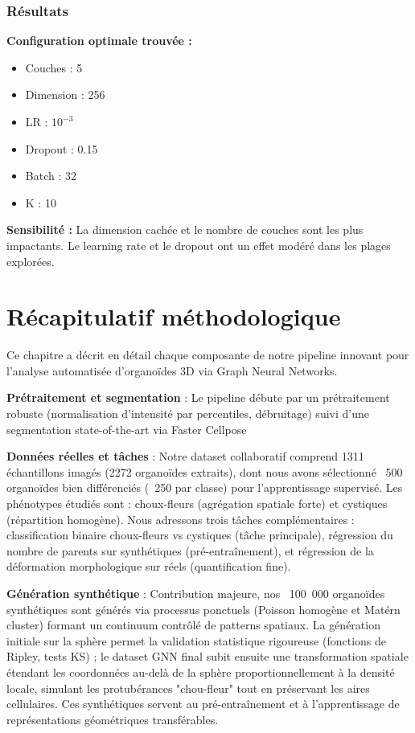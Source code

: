 \subsubsection{Résultats}

\textbf{Configuration optimale trouvée :}
\begin{itemize}
    \item Couches : 5
    \item Dimension : 256
    \item LR : $10^{-3}$
    \item Dropout : 0.15
    \item Batch : 32
    \item K : 10
\end{itemize}

\textbf{Sensibilité :}
La dimension cachée et le nombre de couches sont les plus impactants. Le learning rate et le dropout ont un effet modéré dans les plages explorées.

\section{Récapitulatif méthodologique}

Ce chapitre a décrit en détail chaque composante de notre pipeline innovant pour l'analyse automatisée d'organoïdes 3D via Graph Neural Networks.

\textbf{Prétraitement et segmentation} : Le pipeline débute par un prétraitement robuste (normalisation d'intensité par percentiles, débruitage) suivi d'une segmentation state-of-the-art via Faster Cellpose

\textbf{Données réelles et tâches} : Notre dataset collaboratif comprend 1311 échantillons imagés (2272 organoïdes extraits), dont nous avons sélectionné ~500 organoïdes bien différenciés (~250 par classe) pour l'apprentissage supervisé. Les phénotypes étudiés sont : choux-fleurs (agrégation spatiale forte) et cystiques (répartition homogène). Nous adressons trois tâches complémentaires : classification binaire choux-fleurs vs cystiques (tâche principale), régression du nombre de parents sur synthétiques (pré-entraînement), et régression de la déformation morphologique sur réels (quantification fine).

\textbf{Génération synthétique} : Contribution majeure, nos ~100~000 organoïdes synthétiques sont générés via processus ponctuels (Poisson homogène et Matérn cluster) formant un continuum contrôlé de patterns spatiaux. La génération initiale sur la sphère permet la validation statistique rigoureuse (fonctions de Ripley, tests KS) ; le dataset GNN final subit ensuite une transformation spatiale étendant les coordonnées au-delà de la sphère proportionnellement à la densité locale, simulant les protubérances "chou-fleur" tout en préservant les aires cellulaires. Ces synthétiques servent au pré-entraînement et à l'apprentissage de représentations géométriques transférables.

